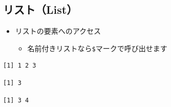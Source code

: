 \documentclass[
  a4paper,
]{ltjsbook}
\newenvironment{Shaded}{\begin{snugshade}}{\end{snugshade}}
\newcommand{\DecValTok}[1]{\textcolor[rgb]{0.68,0.00,0.00}{#1}}
\newcommand{\NormalTok}[1]{\textcolor[rgb]{0.00,0.23,0.31}{#1}}
\newcommand{\SpecialCharTok}[1]{\textcolor[rgb]{0.37,0.37,0.37}{#1}}
\providecommand{\tightlist}{%
  \setlength{\itemsep}{0pt}\setlength{\parskip}{0pt}}\usepackage{longtable,booktabs,array}
\begin{document}
\subsection{リスト（List）}\label{ux30eaux30b9ux30c8list-1}

\begin{itemize}
\tightlist
\item
  リストの要素へのアクセス

  \begin{itemize}
  \tightlist
  \item
    名前付きリストなら\texttt{\$}マークで呼び出せます
  \end{itemize}
\end{itemize}

\begin{Shaded}
\end{Shaded}

\begin{verbatim}
[1] 1 2 3
\end{verbatim}

\begin{Shaded}
\end{Shaded}

\begin{verbatim}
[1] 3
\end{verbatim}

\begin{Shaded}
\end{Shaded}

\begin{verbatim}
[1] 3 4
\end{verbatim}

\begin{Shaded}
\end{Shaded}
\end{document}
